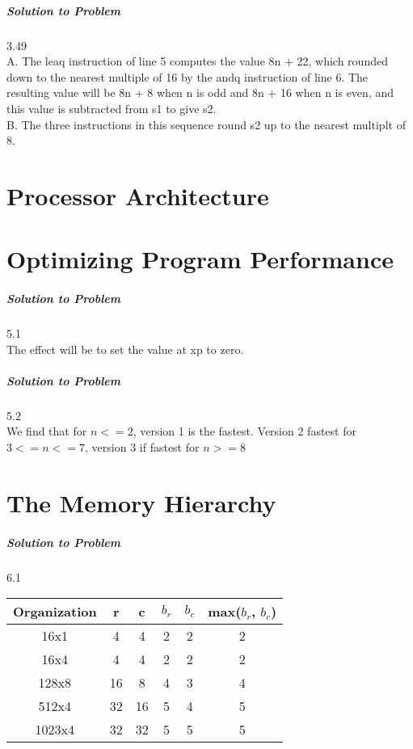 \documentclass{report}
\begin{document}
\paragraph{Solution to Problem } 3.49\\
A. The leaq instruction of line 5 computes the value 8n + 22, which rounded down to the nearest multiple of 16 by the andq instruction of line 6. The resulting value will be 8n + 8 when n is odd and 8n + 16 when n is even, and this value is subtracted from s1 to give s2. \\
B. The three instructions in this sequence round s2 up to the nearest multiplt of 8. \\

\chapter{Processor Architecture}

\chapter{Optimizing Program Performance}
\paragraph{Solution to Problem } 5.1\\
The effect will be to set the value at xp to zero.

\paragraph{Solution to Problem } 5.2\\
We find that for $n<=2$, version 1 is the fastest. Version 2 fastest for $3<= n <= 7$,
version 3 if fastest for $n >= 8$

\chapter{The Memory Hierarchy}
\paragraph{Solution to Problem } 6.1\\
\begin{center}
\begin{tabular}{ |c|c|c|c|c|c| } 
\hline
Organization & r & c & $b_r$ & $b_c$ & max($b_r$, $b_c$) \\
\hline
16x1 & 4 & 4 & 2 & 2 & 2 \\
16x4 & 4 & 4 & 2 & 2 & 2 \\
128x8 & 16 & 8 & 4 & 3 & 4 \\
512x4 & 32 & 16 & 5 & 4 & 5 \\
1023x4 & 32 & 32 & 5 & 5 & 5 \\
\hline
\end{tabular}
\end{center}
\end{document}
